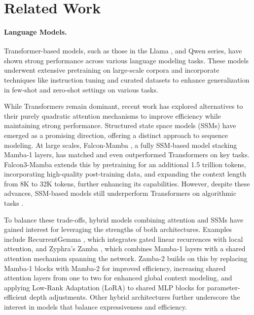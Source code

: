 \section{Related Work}

\paragraph{Language Models.}
Transformer-based models, such as those in the Llama \citep{llama}, and Qwen \citep{qwen2} series, have shown strong performance across various language modeling tasks. These models underwent extensive pretraining on large-scale corpora and incorporate techniques like instruction tuning and curated datasets to enhance generalization in few-shot and zero-shot settings on various tasks.

While Transformers remain dominant, recent work has explored alternatives to their purely quadratic attention mechanisms to improve efficiency while maintaining strong performance. Structured state space models (SSMs) \citep{mamba1, mamba2} have emerged as a promising direction, offering a distinct approach to sequence modeling.
At large scales, Falcon-Mamba \citep{falcon}, a fully SSM-based model stacking Mamba-1 layers, has matched and even outperformed Transformers on key tasks. Falcon3-Mamba extends this by pretraining for an additional 1.5 trillion tokens, incorporating high-quality post-training data, and expanding the context length from 8K to 32K tokens, further enhancing its capabilities.
However, despite these advances, SSM-based models still underperform Transformers on algorithmic tasks \citep{repeat_after_me,wen2024rnnstransformersyetkey,waleffe2024}.

To balance these trade-offs, hybrid models combining attention and SSMs have gained interest for leveraging the strengths of both architectures.
Examples include RecurrentGemma \citep{recurrentgemma}, which integrates gated linear recurrences with local attention, and Zyphra’s Zamba \citep{zamba}, which combines Mamba-1 layers with a shared attention mechanism spanning the network.
Zamba-2 \citep{zamba2} builds on this by replacing Mamba-1 blocks with Mamba-2 for improved efficiency, increasing shared attention layers from one to two for enhanced global context modeling, and applying Low-Rank Adaptation (LoRA) \citep{lora} to shared MLP blocks for parameter-efficient depth adjustments.
Other hybrid architectures \citep{jamba2024, waleffe2024} further underscore the interest in models that balance expressiveness and efficiency.

